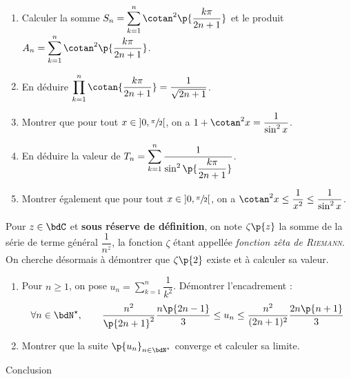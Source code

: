 \documentclass[a4paper,french,bookmarks]{article}
\begin{document}
    \begin{enumerate}[resume]
        \item Calculer la somme $S_n = \displaystyle \sum_{k=1}^n \cotan^2\p{\dfrac{k\pi}{2n+1}}$ et le produit $A_n = \displaystyle \sum_{k=1}^n \cotan^2\p{\dfrac{k\pi}{2n+1}}$.
        
        \item En déduire $\displaystyle\prod_{k=1}^n \cotan{\dfrac{k\pi}{2n+1}} = \dfrac{1}{\sqrt{2n+1}}$.
        
        \item\label{qu:qu8} Montrer que pour tout $x \in \left]0, \sfrac{\pi}{2}\right[$, on a $1 + \cotan^2 x = \dfrac{1}{\sin^2 x}$.
        
        \item En déduire la valeur de $T_n = \displaystyle \sum_{k=1}^n \dfrac{1}{\sin^2\p{\dfrac{k\pi}{2n+1}}}$.
        
        \item Montrer également que pour tout $x \in \left]0, \sfrac{\pi}{2}\right[$, on a $\cotan^2 x \leq \dfrac{1}{x^2} \leq \dfrac{1}{\sin^2 x}$.
    \end{enumerate}
    Pour $z \in \bdC$ et \textbf{sous réserve de définition}, on note $\zeta\p{z}$ la somme de la série de terme général $\dfrac{1}{n^z}$, la fonction $\zeta$ étant appellée \emph{fonction zêta de \textsc{Riemann}}. On cherche désormais à démontrer que $\zeta\p{2}$ existe et à calculer sa valeur.
    \begin{enumerate}[resume]
        \item Pour $n \geq 1$, on pose $u_n = \displaystyle\sum_{k=1}^n \dfrac{1}{k^2}$. Démontrer l'encadrement :
        \[ \forall n \in \bdN^\star,\qquad \dfrac{n^2}{\p{2n+1}^2}\dfrac{n\p{2n-1}}{3} \leq u_n \leq \dfrac{n^2}{(2n+1)^2}\dfrac{2n\p{n+1}}{3} \]
        
        \item Montrer que la suite $\p{u_n}_{n \in \bdN^\star}$ converge et calculer sa limite.
    \end{enumerate}
    
    \begin{form}{Conclusion}{}
        \centering{}
    \end{form}
    
    
\end{document}
